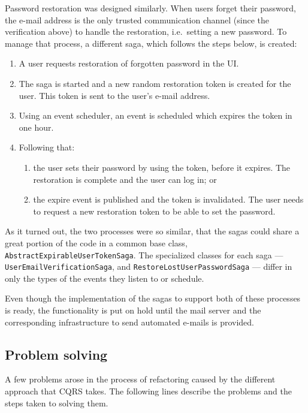 \documentclass{book}
\begin{document}
Password restoration was designed similarly. When users forget their
password, the e-mail address is the only trusted communication channel
(since the verification above) to handle the restoration, i.e.~setting a
new password. To manage that process, a different saga, which follows
the steps below, is created:

\begin{enumerate}
\def\labelenumi{\arabic{enumi}.}
\tightlist
\item
  A user requests restoration of forgotten password in the UI.
\item
  The saga is started and a new random restoration token is created for
  the user. This token is sent to the user's e-mail address.
\item
  Using an event scheduler, an event is scheduled which expires the
  token in one hour.
\item
  Following that:

  \begin{enumerate}
  \def\labelenumii{\alph{enumii})}
  \tightlist
  \item
    the user sets their password by using the token, before it expires.
    The restoration is complete and the user can log in; or
  \item
    the expire event is published and the token is invalidated. The user
    needs to request a new restoration token to be able to set the
    password.
  \end{enumerate}
\end{enumerate}

As it turned out, the two processes were so similar, that the sagas
could share a great portion of the code in a common base class,
\texttt{AbstractExpirableUserTokenSaga}. The specialized classes for
each saga --- \texttt{UserEmailVerificationSaga}, and
\texttt{RestoreLostUserPasswordSaga} --- differ in only the types of the
events they listen to or schedule.

Even though the implementation of the sagas to support both of these
processes is ready, the functionality is put on hold until the mail
server and the corresponding infrastructure to send automated e-mails is
provided.


\subsection{Problem solving}\label{problem-solving}

A few problems arose in the process of refactoring caused by the
different approach that CQRS takes. The following lines describe the
problems and the steps taken to solving them.
\end{document}
